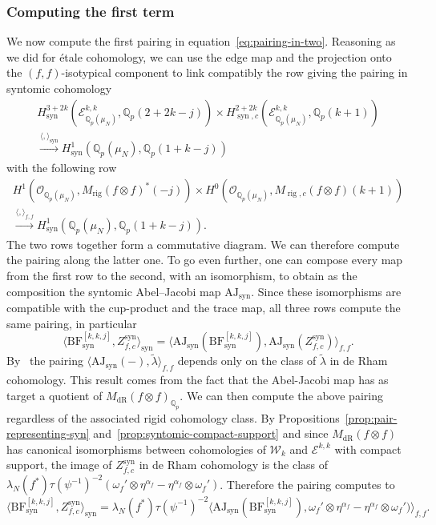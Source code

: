 \documentclass[10pt,a4paper]{amsart}
\newcommand{\BF}{\mathrm{BF}}
\newcommand{\Ell}{\mathcal{E}}
\newcommand{\KS}{\mathscr{W}}
\DeclareMathOperator{\syn}{syn}
\newcommand{\AJ}{\mathrm{AJ}}
\newcommand{\Q}{\numberset{Q}}
\DeclareMathOperator{\dR}{dR}
\DeclareMathOperator{\rig}{rig}
\newcommand{\ringint}{\mathcal}
\newcommand{\numberset}{\mathbb}
\begin{document}
\subsubsection*{Computing the first term}
We now compute the first pairing in equation~\eqref{eq:pairing-in-two}. Reasoning as we did for étale cohomology, we can use the edge map and the projection onto the $(f,f)$-isotypical component to link compatibly the row giving the pairing in syntomic cohomology
\begin{multline*}
    H^{3+2k}_{\syn}(\Ell^{k,k}_{\Q_p(\mu_N)},\Q_p(2+2k-j)) \times H^{2+2k}_{\syn,c}(\Ell^{k,k}_{\Q_p(\mu_N)},\Q_p(k+1)) \\
    \xrightarrow{\langle , \rangle_{\syn}} H^1_{\syn}(\Q_p(\mu_N),\Q_p(1+k-j))
\end{multline*}
with the following row
\begin{multline*}
        H^1(\ringint{O}_{\Q_p(\mu_N)},M_{\rig}(f\otimes f)^*(-j)) \times H^0(\ringint{O}_{\Q_p(\mu_N)},M_{\rig,c}(f\otimes f)(k+1)) \\
    \xrightarrow{\langle , \rangle_{f,f}} H^1_{\syn}(\Q_p(\mu_N),\Q_p(1+k-j)).
\end{multline*}
The two rows together form a commutative diagram. We can therefore compute the pairing along the latter one. To go even further, one can compose every map from the first row to the second, with an isomorphism, to obtain as the composition the syntomic Abel--Jacobi map $\AJ_{\syn}$. Since these isomorphisms are compatible with the cup-product and the trace map, all three rows compute the same pairing, in particular
\[
    \langle \BF^{[k,k,j]}_{\syn},Z_{f,c}^{\syn}\rangle_{\syn} = \langle \AJ_{\syn}(\BF^{[k,k,j]}_{\syn}),\AJ_{\syn}(Z_{f,c}^{\syn})\rangle_{f,f}.
\]
By~\cite[Proposition~6.3.1]{KLZ20} the pairing $\langle \AJ_{\syn}(-), \tilde{\lambda} \rangle_{f,f}$ depends only on the class of $\tilde{\lambda}$ in de Rham cohomology. This result comes from the fact that the Abel-Jacobi map has as target a quotient of $M_{\dR}(f\otimes f)_{\Q_p}$. We can then compute the above pairing regardless of the associated rigid cohomology class. By Propositions~\ref{prop:pair-representing-syn} and~\ref{prop:syntomic-compact-support} and since $M_{\dR}(f\otimes f)$ has canonical isomorphisms between cohomologies of $\KS_k$ and $\Ell^{k,k}$ with compact support, the image of $Z_{f,c}^{\syn}$ in de Rham cohomology is the class of $\lambda_N(f^*)\tau(\psi^{-1})^{-2}(\omega_f'\otimes\eta^{\alpha_f} -\eta^{\alpha_f}\otimes\omega_f')$. Therefore the pairing computes to
\[
 \langle \BF^{[k,k,j]}_{\syn},Z_{f,c}^{\syn}\rangle_{\syn} = \lambda_N(f^*)\tau(\psi^{-1})^{-2}\langle \AJ_{\syn}(\BF^{[k,k,j]}_{\syn}),\omega_f'\otimes\eta^{\alpha_f} -\eta^{\alpha_f}\otimes\omega_f')\rangle_{f,f}.
\]
\end{document}
